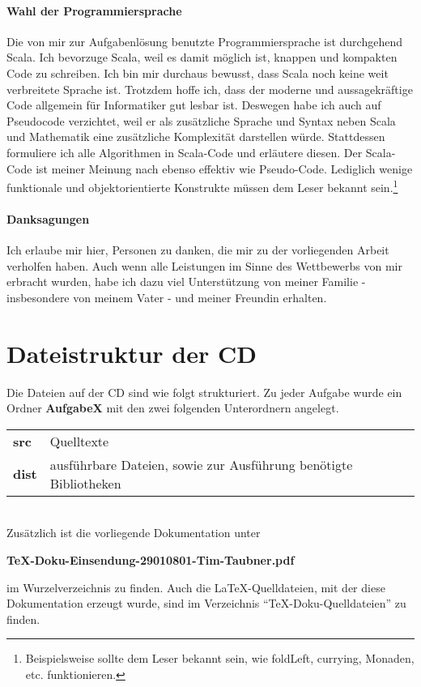 \documentclass[a4paper,10pt,notitlepage]{scrreprt}
\begin{document}
\paragraph{Wahl der Programmiersprache}
 Die von mir zur Aufgabenlösung benutzte Programmiersprache ist durchgehend Scala.
 Ich bevorzuge Scala, weil es damit möglich ist, knappen und kompakten Code zu schreiben.
 Ich bin mir durchaus bewusst, dass Scala noch keine weit verbreitete Sprache ist.
 Trotzdem hoffe ich, dass der moderne und aussagekräftige Code allgemein für Informatiker gut lesbar ist.
 Deswegen habe ich auch auf Pseudocode verzichtet,
  weil er als zusätzliche Sprache und Syntax neben Scala und Mathematik eine zusätzliche Komplexität darstellen würde.
 Stattdessen formuliere ich alle Algorithmen in Scala-Code und erläutere diesen.
 Der Scala-Code ist meiner Meinung nach ebenso effektiv wie Pseudo-Code.
 Lediglich wenige funktionale und objektorientierte Konstrukte müssen dem Leser bekannt sein.\footnote{Beispielsweise
  sollte dem Leser bekannt sein, wie foldLeft, currying, Monaden, etc. funktionieren.}
\paragraph{Danksagungen}
 Ich erlaube mir hier, Personen zu danken, die mir zu der vorliegenden Arbeit verholfen haben.
 Auch wenn alle Leistungen im Sinne des Wettbewerbs von mir erbracht wurden,
  habe ich dazu viel Unterstützung von meiner Familie - insbesondere von meinem Vater - und meiner Freundin erhalten.
\section{Dateistruktur der CD}
 Die Dateien auf der CD sind wie folgt strukturiert.
 Zu jeder Aufgabe wurde ein Ordner \textbf{AufgabeX} mit den zwei folgenden Unterordnern angelegt.\\

 \begin{tabular}{ll}
  \textbf{src}  & Quelltexte \\
  \textbf{dist} & ausführbare Dateien, sowie zur Ausführung benötigte Bibliotheken \\
 \end{tabular}\\ \newline
 Zusätzlich ist die vorliegende Dokumentation unter
 \begin{center}\textbf{TeX-Doku-Einsendung-29010801-Tim-Taubner.pdf}\end{center}
 im Wurzelverzeichnis zu finden.
 Auch die \LaTeX-Quelldateien, mit der diese Dokumentation erzeugt wurde, sind im Verzeichnis ``TeX-Doku-Quelldateien'' zu finden.
\end{document}
